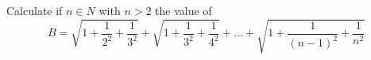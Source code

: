 Calculate if $n\in N$ with $n>2$ the value of
$$B=\sqrt{1+\frac{1}{2^2}+\frac{1}{3^2}}+\sqrt{1+\frac{1}{3^2}+\frac{1}{4^2}}+...+\sqrt{1+\frac{1}{(n-1)^2}+\frac{1}{n^2}} $$